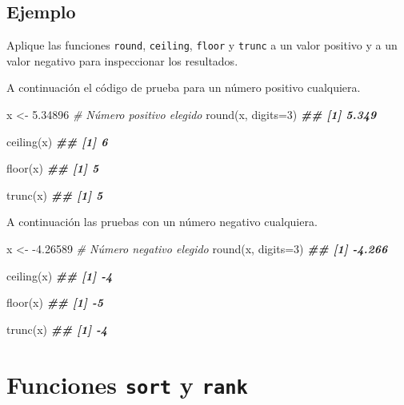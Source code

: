 \documentclass[
]{book}
\newenvironment{Shaded}{\begin{snugshade}}{\end{snugshade}}
\newcommand{\AttributeTok}[1]{\textcolor[rgb]{0.77,0.63,0.00}{#1}}
\newcommand{\CommentTok}[1]{\textcolor[rgb]{0.56,0.35,0.01}{\textit{#1}}}
\newcommand{\DecValTok}[1]{\textcolor[rgb]{0.00,0.00,0.81}{#1}}
\newcommand{\DocumentationTok}[1]{\textcolor[rgb]{0.56,0.35,0.01}{\textbf{\textit{#1}}}}
\newcommand{\FloatTok}[1]{\textcolor[rgb]{0.00,0.00,0.81}{#1}}
\newcommand{\FunctionTok}[1]{\textcolor[rgb]{0.00,0.00,0.00}{#1}}
\newcommand{\NormalTok}[1]{#1}
\newcommand{\OtherTok}[1]{\textcolor[rgb]{0.56,0.35,0.01}{#1}}
\newcommand{\SpecialCharTok}[1]{\textcolor[rgb]{0.00,0.00,0.00}{#1}}
\begin{document}
\hypertarget{ejemplo-13}{%
\subsection*{Ejemplo}\label{ejemplo-13}}

Aplique las funciones \texttt{round}, \texttt{ceiling}, \texttt{floor} y \texttt{trunc} a un valor positivo y a un valor negativo para inspeccionar los resultados.

A continuación el código de prueba para un número positivo cualquiera.

\begin{Shaded}
\begin{Highlighting}[]
\NormalTok{x }\OtherTok{\textless{}{-}} \FloatTok{5.34896}  \CommentTok{\# Número positivo elegido}
\FunctionTok{round}\NormalTok{(x, }\AttributeTok{digits=}\DecValTok{3}\NormalTok{)}
\DocumentationTok{\#\# [1] 5.349}

\FunctionTok{ceiling}\NormalTok{(x)}
\DocumentationTok{\#\# [1] 6}

\FunctionTok{floor}\NormalTok{(x)}
\DocumentationTok{\#\# [1] 5}

\FunctionTok{trunc}\NormalTok{(x)}
\DocumentationTok{\#\# [1] 5}
\end{Highlighting}
\end{Shaded}

A continuación las pruebas con un número negativo cualquiera.

\begin{Shaded}
\begin{Highlighting}[]
\NormalTok{x }\OtherTok{\textless{}{-}} \SpecialCharTok{{-}}\FloatTok{4.26589}  \CommentTok{\# Número negativo elegido}
\FunctionTok{round}\NormalTok{(x, }\AttributeTok{digits=}\DecValTok{3}\NormalTok{)}
\DocumentationTok{\#\# [1] {-}4.266}

\FunctionTok{ceiling}\NormalTok{(x)}
\DocumentationTok{\#\# [1] {-}4}

\FunctionTok{floor}\NormalTok{(x)}
\DocumentationTok{\#\# [1] {-}5}

\FunctionTok{trunc}\NormalTok{(x)}
\DocumentationTok{\#\# [1] {-}4}
\end{Highlighting}
\end{Shaded}

\hypertarget{funciones-sort-y-rank}{%
\section{\texorpdfstring{Funciones \texttt{sort} y \texttt{rank}}{Funciones sort y rank}}\label{funciones-sort-y-rank}}
\end{document}
